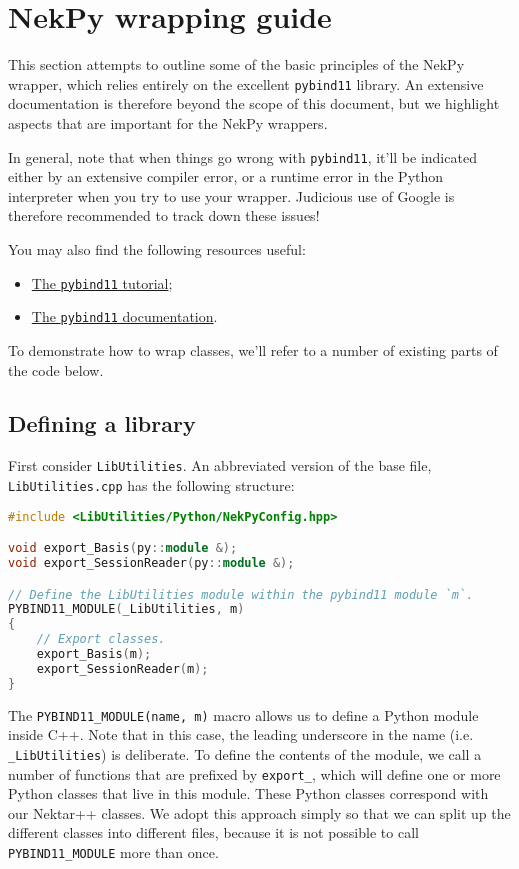 \chapter{NekPy wrapping guide}

This section attempts to outline some of the basic principles of the NekPy
wrapper, which relies entirely on the excellent \texttt{pybind11} library. An
extensive documentation is therefore beyond the scope of this document, but we
highlight aspects that are important for the NekPy wrappers.

In general, note that when things go wrong with \texttt{pybind11}, it'll be
indicated either by an extensive compiler error, or a runtime error in the
Python interpreter when you try to use your wrapper. Judicious use of Google is
therefore recommended to track down these issues!

You may also find the following resources useful:

\begin{itemize}
  \item \href{https://pybind11.readthedocs.io/en/stable/basics.html}{The \texttt{pybind11} tutorial};
  \item \href{https://pybind11.readthedocs.io/en/stable/index.html}{The \texttt{pybind11} documentation}.
\end{itemize}

To demonstrate how to wrap classes, we'll refer to a number of existing parts of
the code below.

\section{Defining a library}

First consider \texttt{LibUtilities}. An abbreviated version of the base file,
\texttt{LibUtilities.cpp} has the following structure:

\begin{lstlisting}[caption={Defining a library with pybind11}, label={lst:defining_a_library}, language=C++]
#include <LibUtilities/Python/NekPyConfig.hpp>

void export_Basis(py::module &);
void export_SessionReader(py::module &);

// Define the LibUtilities module within the pybind11 module `m`.
PYBIND11_MODULE(_LibUtilities, m)
{
    // Export classes.
    export_Basis(m);
    export_SessionReader(m);
}
\end{lstlisting}

The \texttt{PYBIND11\_MODULE(name, m)} macro allows us to define a Python module
inside C++. Note that in this case, the leading underscore in the name
(i.e. \texttt{\_LibUtilities}) is deliberate. To define the contents of the module,
we call a number of functions that are prefixed by \texttt{export\_}, which will
define one or more Python classes that live in this module. These Python classes
correspond with our Nektar++ classes. We adopt this approach simply so that we
can split up the different classes into different files, because it is not
possible to call \texttt{PYBIND11\_MODULE} more than once.

